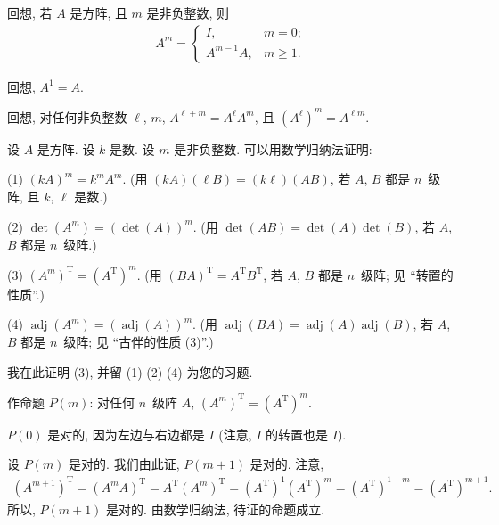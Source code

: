 \documentclass[../libro.tex]{subfiles}
\begin{document}
\begin{example}
    回想, 若 \(A\) 是方阵, 且 \(m\) 是非负整数,
    则
    \begin{align*}
        A^m =
        \begin{cases}
            I,         & m = 0;    \\
            A^{m-1} A, & m \geq 1.
        \end{cases}
    \end{align*}

    回想, \(A^1 = A\).

    回想, 对任何非负整数 \(\ell\), \(m\),
    \(A^{\ell + m} = A^{\ell} A^m\),
    且 \((A^{\ell})^m = A^{\ell m}\).

    设 \(A\) 是方阵.
    设 \(k\) 是数.
    设 \(m\) 是非负整数.
    可以用数学归纳法证明:

    (1)
    \((kA)^m = k^m A^m\).
    (用 \((k A) (\ell B) = (k \ell) (A B)\), %
    若 \(A\), \(B\) 都是 \(n\)~级阵,
    且 \(k\), \(\ell\) 是数.) %

    (2)
    \(\det {(A^m)} = (\det {(A)})^m\).
    (用 \(\det {(AB)} = \det {(A)} \det {(B)}\),
    若 \(A\), \(B\) 都是 \(n\)~级阵.)

    (3)
    \((A^m)^{\mathrm{T}} = (A^{\mathrm{T}})^m\).
    (用 \((BA)^{\mathrm{T}} = A^{\mathrm{T}} B^{\mathrm{T}}\), %
    若 \(A\), \(B\) 都是 \(n\)~级阵;
    见 ``转置的性质''.) %

    (4)
    \(\operatorname{adj} {(A^m)}
    = (\operatorname{adj} {(A)})^m\).
    (用 \(\operatorname{adj} {(BA)} %
    = \operatorname{adj} {(A)} \operatorname{adj} {(B)}\), %
    若 \(A\), \(B\) 都是 \(n\)~级阵;
    见 ``古伴的性质 (3)''.) %

    我在此证明 (3), 并留 (1) (2) (4) 为您的习题.

    作命题 \(P(m)\):
    对任何 \(n\)~级阵 \(A\),
    \((A^m)^{\mathrm{T}} = (A^{\mathrm{T}})^m\).

    \(P(0)\) 是对的, 因为左边与右边都是 \(I\)
    (注意, \(I\) 的转置也是 \(I\)).

    设 \(P(m)\) 是对的.
    我们由此证, \(P(m+1)\) 是对的.
    注意,
    \begin{align*}
        (A^{m+1})^{\mathrm{T}}
        = (A^m A)^{\mathrm{T}}
        = A^{\mathrm{T}} (A^m)^{\mathrm{T}}
        = (A^{\mathrm{T}})^1 (A^{\mathrm{T}})^m
        = (A^{\mathrm{T}})^{1+m}
        = (A^{\mathrm{T}})^{m+1}.
    \end{align*}
    所以, \(P(m+1)\) 是对的.
    由数学归纳法, 待证的命题成立.
\end{example}
\end{document}
